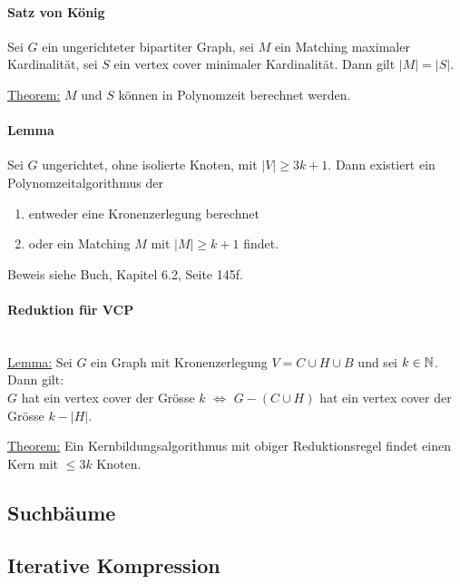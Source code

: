\paragraph{Satz von König}
Sei $G$ ein ungerichteter bipartiter Graph, sei $M$ ein Matching maximaler Kardinalität,
sei $S$ ein vertex cover minimaler Kardinalität.
Dann gilt $|M| = |S|$.

\underline{Theorem:} $M$ und $S$ können in Polynomzeit berechnet werden.

\paragraph{Lemma}
Sei $G$ ungerichtet, ohne isolierte Knoten, mit $|V| \geq 3k+1$.
Dann existiert ein Polynomzeitalgorithmus der
\begin{enumerate}[label=(\roman*)]
    \item entweder eine Kronenzerlegung berechnet
    \item oder ein Matching $M$ mit $|M| \geq k+1$ findet.
\end{enumerate}
Beweis siehe Buch, Kapitel 6.2, Seite 145f.

\paragraph{Reduktion für VCP} \mbox{} \\
\underline{Lemma:}
Sei $G$ ein Graph mit Kronenzerlegung $V = C \cup H \cup B$ und sei $k \in \mathbb{N}$. Dann gilt: \\
$G$ hat ein vertex cover der Grösse $k$ $\iff$ $G - (C \cup H)$ hat ein vertex cover der Grösse $k - |H|$.

\underline{Theorem:} Ein Kernbildungsalgorithmus mit obiger Reduktionsregel findet einen Kern mit $\leq 3k$ Knoten.


\subsection{Suchbäume}


\subsection{Iterative Kompression}


